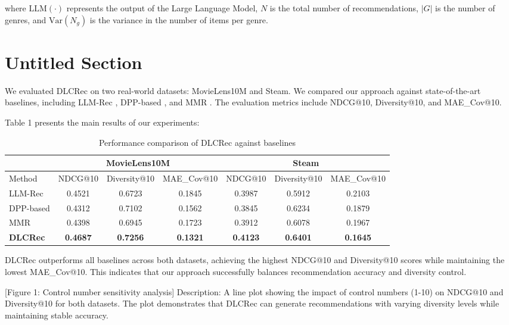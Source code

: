 \documentclass[10pt,twocolumn,letterpaper]{article}
\begin{document}
where $\text{LLM}(\cdot)$ represents the output of the Large Language Model, $N$ is the total number of recommendations, $|G|$ is the number of genres, and $\text{Var}(N_g)$ is the variance in the number of items per genre.

\section{Untitled Section}

We evaluated DLCRec on two real-world datasets: MovieLens10M and Steam. We compared our approach against state-of-the-art baselines, including LLM-Rec \cite{llmrec}, DPP-based \cite{dpp}, and MMR \cite{mmr}. The evaluation metrics include NDCG@10, Diversity@10, and MAE_Cov@10.

Table 1 presents the main results of our experiments:

\begin{table}[h]
\centering
\begin{tabular}{|l|c|c|c|c|c|c|}
\hline
& \multicolumn{3}{c|}{MovieLens10M} & \multicolumn{3}{c|}{Steam} \\
\hline
Method & NDCG@10 & Diversity@10 & MAE_Cov@10 & NDCG@10 & Diversity@10 & MAE_Cov@10 \\
\hline
LLM-Rec & 0.4521 & 0.6723 & 0.1845 & 0.3987 & 0.5912 & 0.2103 \\
DPP-based & 0.4312 & 0.7102 & 0.1562 & 0.3845 & 0.6234 & 0.1879 \\
MMR & 0.4398 & 0.6945 & 0.1723 & 0.3912 & 0.6078 & 0.1967 \\
\textbf{DLCRec} & \textbf{0.4687} & \textbf{0.7256} & \textbf{0.1321} & \textbf{0.4123} & \textbf{0.6401} & \textbf{0.1645} \\
\hline
\end{tabular}
\caption{Performance comparison of DLCRec against baselines}
\end{table}

DLCRec outperforms all baselines across both datasets, achieving the highest NDCG@10 and Diversity@10 scores while maintaining the lowest MAE_Cov@10. This indicates that our approach successfully balances recommendation accuracy and diversity control.

[Figure 1: Control number sensitivity analysis]
Description: A line plot showing the impact of control numbers (1-10) on NDCG@10 and Diversity@10 for both datasets. The plot demonstrates that DLCRec can generate recommendations with varying diversity levels while maintaining stable accuracy.
\end{document}
